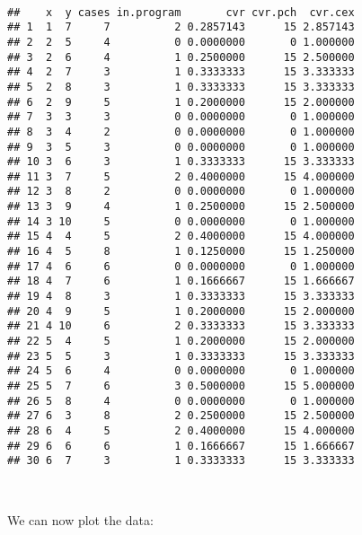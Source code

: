 \documentclass[
  12pt,
  a4paper]{book}
\newenvironment{Shaded}{\begin{snugshade}}{\end{snugshade}}
\newcommand{\DecValTok}[1]{\textcolor[rgb]{0.00,0.00,0.81}{#1}}
\newcommand{\FunctionTok}[1]{\textcolor[rgb]{0.00,0.00,0.00}{#1}}
\newcommand{\NormalTok}[1]{#1}
\newcommand{\OtherTok}[1]{\textcolor[rgb]{0.56,0.35,0.01}{#1}}
\newcommand{\SpecialCharTok}[1]{\textcolor[rgb]{0.00,0.00,0.00}{#1}}
\begin{document}
~

\begin{Shaded}
\end{Shaded}

\begin{verbatim}
##    x  y cases in.program       cvr cvr.pch  cvr.cex
## 1  1  7     7          2 0.2857143      15 2.857143
## 2  2  5     4          0 0.0000000       0 1.000000
## 3  2  6     4          1 0.2500000      15 2.500000
## 4  2  7     3          1 0.3333333      15 3.333333
## 5  2  8     3          1 0.3333333      15 3.333333
## 6  2  9     5          1 0.2000000      15 2.000000
## 7  3  3     3          0 0.0000000       0 1.000000
## 8  3  4     2          0 0.0000000       0 1.000000
## 9  3  5     3          0 0.0000000       0 1.000000
## 10 3  6     3          1 0.3333333      15 3.333333
## 11 3  7     5          2 0.4000000      15 4.000000
## 12 3  8     2          0 0.0000000       0 1.000000
## 13 3  9     4          1 0.2500000      15 2.500000
## 14 3 10     5          0 0.0000000       0 1.000000
## 15 4  4     5          2 0.4000000      15 4.000000
## 16 4  5     8          1 0.1250000      15 1.250000
## 17 4  6     6          0 0.0000000       0 1.000000
## 18 4  7     6          1 0.1666667      15 1.666667
## 19 4  8     3          1 0.3333333      15 3.333333
## 20 4  9     5          1 0.2000000      15 2.000000
## 21 4 10     6          2 0.3333333      15 3.333333
## 22 5  4     5          1 0.2000000      15 2.000000
## 23 5  5     3          1 0.3333333      15 3.333333
## 24 5  6     4          0 0.0000000       0 1.000000
## 25 5  7     6          3 0.5000000      15 5.000000
## 26 5  8     4          0 0.0000000       0 1.000000
## 27 6  3     8          2 0.2500000      15 2.500000
## 28 6  4     5          2 0.4000000      15 4.000000
## 29 6  6     6          1 0.1666667      15 1.666667
## 30 6  7     3          1 0.3333333      15 3.333333
\end{verbatim}

~

We can now plot the data:
\end{document}
